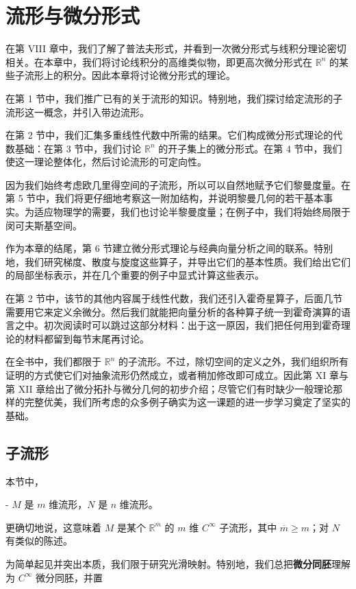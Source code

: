 \chapter{流形与微分形式}
在第 VIII 章中，我们了解了普法夫形式，并看到一次微分形式与线积分理论密切相关。在本章中，我们将讨论线积分的高维类似物，即更高次微分形式在 $ \mathbb{R}^n $ 的某些子流形上的积分。因此本章将讨论微分形式的理论。

在第 1 节中，我们推广已有的关于流形的知识。特别地，我们探讨给定流形的子流形这一概念，并引入带边流形。

在第 2 节中，我们汇集多重线性代数中所需的结果。它们构成微分形式理论的代数基础：在第 3 节中，我们讨论 $ \mathbb{R}^n $ 的开子集上的微分形式。在第 4 节中，我们使这一理论整体化，然后讨论流形的可定向性。

因为我们始终考虑欧几里得空间的子流形，所以可以自然地赋予它们黎曼度量。在第 5 节中，我们将更仔细地考察这一附加结构，并说明黎曼几何的若干基本事实。为适应物理学的需要，我们也讨论半黎曼度量；在例子中，我们将始终局限于闵可夫斯基空间。

作为本章的结尾，第 6 节建立微分形式理论与经典向量分析之间的联系。特别地，我们研究梯度、散度与旋度这些算子，并导出它们的基本性质。我们给出它们的局部坐标表示，并在几个重要的例子中显式计算这些表示。

在第 2 节中，该节的其他内容属于线性代数，我们还引入霍奇星算子，后面几节需要用它来定义余微分。然后我们就能把向量分析的各种算子统一到霍奇演算的语言之中。初次阅读时可以跳过这部分材料：出于这一原因，我们把任何用到霍奇理论的材料都留到每节末尾再讨论。

在全书中，我们都限于 $ \mathbb{R}^n $ 的子流形。不过，除切空间的定义之外，我们组织所有证明的方式使它们对抽象流形仍然成立，或者稍加修改即可成立。因此第 XI 章与第 XII 章给出了微分拓扑与微分几何的初步介绍；尽管它们有时缺少一般理论那样的完整优美，我们所考虑的众多例子确实为这一课题的进一步学习奠定了坚实的基础。

\section{子流形}

本节中，

- $ M $ 是 $ m $ 维流形，$ N $ 是 $ n $ 维流形。

更确切地说，这意味着 $ M $ 是某个 $ \mathbb{R}^{\overline{m}} $ 的 $ m $ 维 $ C^\infty $ 子流形，其中 $ \overline{m}\ge m $；对 $ N $ 有类似的陈述。

为简单起见并突出本质，我们限于研究光滑映射。特别地，我们总把\textbf{微分同胚}理解为 $ C^\infty $ 微分同胚，并置

